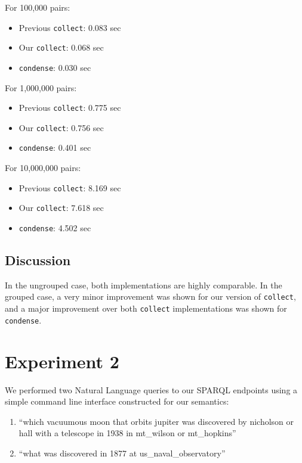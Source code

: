 \documentclass[../main.tex]{subfiles}
\begin{document}
\noindent For 100,000 pairs:
\begin{itemize}
	\item Previous \texttt{collect}: 0.083 sec
	\item Our \texttt{collect}: 0.068 sec
	\item \texttt{condense}: 0.030 sec
\end{itemize}

\noindent For 1,000,000 pairs:
\begin{itemize}
	\item Previous \texttt{collect}: 0.775 sec
	\item Our \texttt{collect}: 0.756 sec
	\item \texttt{condense}: 0.401 sec
\end{itemize}

\noindent For 10,000,000 pairs:
\begin{itemize}
	\item Previous \texttt{collect}: 8.169 sec
	\item Our \texttt{collect}: 7.618 sec
	\item \texttt{condense}: 4.502 sec
\end{itemize}

\subsection{Discussion}

In the ungrouped case, both implementations are highly comparable.
In the grouped case, a very minor improvement was shown for our version of \texttt{collect},
and a major improvement over both \texttt{collect} implementations was shown for \texttt{condense}.

\section{Experiment 2}

We performed two Natural Language queries to our SPARQL endpoints using a simple command line interface constructed for our semantics:

\begin{enumerate}
	\item ``which vacuumous moon that orbits jupiter was discovered by nicholson or hall with a telescope in 1938 in mt\_wilson or mt\_hopkins''
	\item ``what was discovered in 1877 at us\_naval\_observatory''
\end{enumerate}
\end{document}
